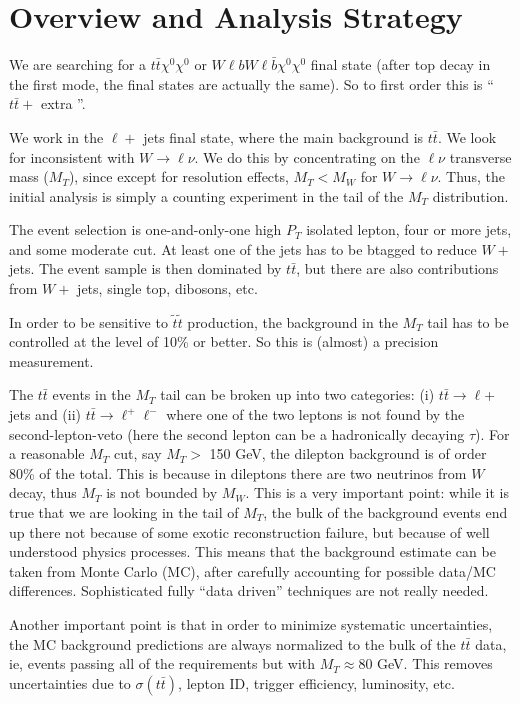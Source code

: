 \section{Overview and Analysis Strategy}
\label{sec:overview}

We are searching for a $t\bar{t}\chi^0\chi^0$ or $W \ell b W \ell \bar{b} \chi^0 \chi^0$ final state
(after top decay in the first mode, the final states are actually the same).  So to first order 
this is ``$t\bar{t} +$ extra \met''.  

We work in the $\ell +$ jets final state, where the main background is $t\bar{t}$.  We look for 
\met inconsistent with $W \to \ell \nu$.  We do this by concentrating on the $\ell \nu$ transverse
mass ($M_T$), since except for resolution effects, $M_T < M_W$ for $W \to \ell \nu$.  Thus, the
initial analysis is simply a counting experiment in the tail of the $M_T$ distribution.  

The event selection is one-and-only-one high $P_T$ isolated lepton, four or more jets, and
some moderate \met cut.  At least one of the jets has to be btagged to reduce $W+$ jets.
The event sample is then dominated by $t\bar{t}$, but there are also contributions from $W+$ jets,
single top, dibosons, etc.

In order to be sensitive to $\widetilde{t}\widetilde{t}$ production, the background in the $M_T$
tail has to be controlled at the level of 10\% or better. So this is (almost) a precision measurement.

The $t\bar{t}$ events in the $M_T$ tail can be broken up into two categories: 
(i) $t\bar{t} \to \ell $+ jets and (ii) $t\bar{t} \to \ell^+ \ell^-$ where one of the two
leptons is not found by the second-lepton-veto (here the second lepton can be a hadronically
decaying $\tau$).
 For a reasonable $M_T$ cut, say $M_T >$ 150 GeV, the dilepton background is of order 80\% of 
the total.  This is because in dileptons there are two neutrinos from $W$ decay, thus $M_T$
is not bounded by $M_W$.  This is a very important point: while it is true that we are looking in
the tail of $M_T$, the bulk of the background events end up there not because of some exotic
\met reconstruction failure, but because of well understood physics processes.  This means that 
the background estimate can be taken from Monte Carlo (MC), after carefully accounting for possible
data/MC differences.  Sophisticated fully ``data driven'' techniques are not really needed.

Another important point is that in order to minimize systematic uncertainties, the MC background
predictions are always normalized to the bulk of the $t\bar{t}$ data, ie, events passing all of the 
requirements but with $M_T \approx 80$ GeV.
This removes uncertainties
due to $\sigma(t\bar{t})$, lepton ID, trigger efficiency, luminosity, etc.   


